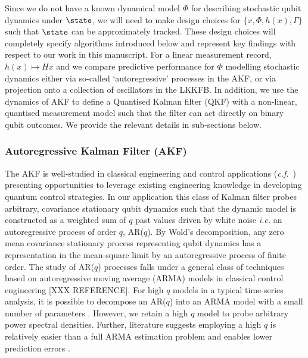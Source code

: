 Since we do not have a known dynamical model $\Phi$ for describing stochastic qubit dynamics under $\state$, we will need to make design choices for  $\{ x, \Phi, h(x), \Gamma \}$  such that $\state$ can be approximately tracked. These design choices will completely specify algorithms introduced below and represent key findings with respect to our work in this manuscript. For a linear measurement record, $h(x) \mapsto Hx$ and we compare predictive performance for $\Phi$ modelling stochastic dynamics either via so-called `autoregressive' processes in the AKF, or via projection onto a collection of oscillators in the LKKFB.  In addition, we use the dynamics of AKF to define a Quantised Kalman filter (QKF) with a non-linear, quantised measurement model such that the filter can act directly on binary qubit outcomes. We provide the relevant details in sub-sections below. 
 


\subsubsection{Autoregressive Kalman Filter (AKF)}

The AKF is well-studied in classical engineering and control applications (\emph{c.f.}~\cite{moon2006real}) presenting opportunities to leverage existing engineering knowledge in developing quantum control strategies.  In our application this class of Kalman filter probes arbitrary, covariance stationary qubit dynamics such that the dynamic model is constructed as a weighted sum of $q$ past values driven by white noise {\em i.e.} an autoregressive process of order $q$, AR($q$). By Wold's decomposition, any zero mean covariance stationary process representing qubit dynamics has a representation in the mean-square limit by an autoregressive process of finite order.%
The study of AR($q$) processes falls under a general class of techniques based on autoregressive moving average (ARMA) models in classical control engineering [XXX REFERENCE]. For high $q$ models in a typical time-series analysis, it is possible to decompose an AR($q$) into an ARMA model with a small number of parameters \cite{brockwell1996introduction, salzmann1991detection}. However, we retain a high $q$ model to probe arbitrary power spectral densities. Further, literature suggests employing a high $q$ is relatively easier than a full ARMA estimation problem and enables lower prediction errors \cite{wahlberg1989estimation,brockwell1996introduction}.

